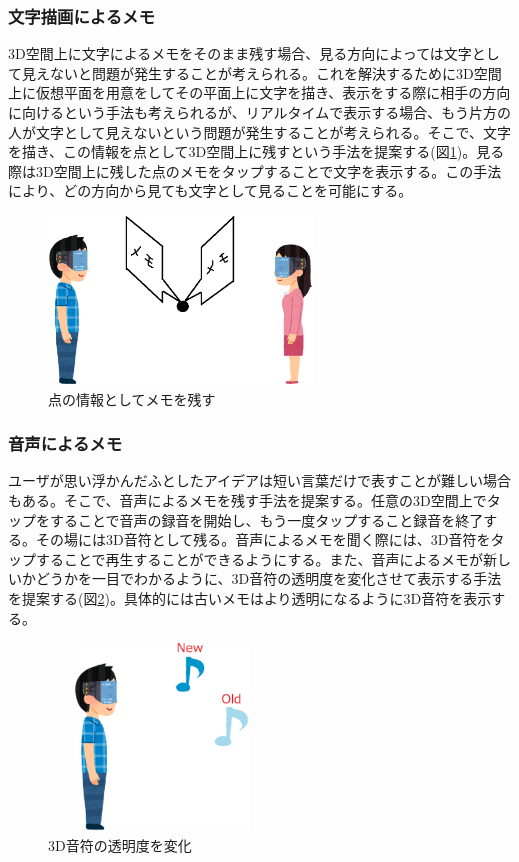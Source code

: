 \documentclass{hissymp}
\begin{document}
\subsubsection{文字描画によるメモ}
3D空間上に文字によるメモをそのまま残す場合、見る方向によっては文字として見えないと問題が発生することが考えられる。これを解決するために3D空間上に仮想平面を用意をしてその平面上に文字を描き、表示をする際に相手の方向に向けるという手法も考えられるが、リアルタイムで表示する場合、もう片方の人が文字として見えないという問題が発生することが考えられる。そこで、文字を描き、この情報を点として3D空間上に残すという手法を提案する(図\ref{fig:tennomemo})。見る際は3D空間上に残した点のメモをタップすることで文字を表示する。この手法により、どの方向から見ても文字として見ることを可能にする。

\begin{figure}[h]
  \begin{center}
    \includegraphics[clip,width=7.0cm]{./tennomemo.eps}
    \caption{点の情報としてメモを残す}
    \label{fig:tennomemo}
  \end{center}
\end{figure}

\subsubsection{音声によるメモ}
ユーザが思い浮かんだふとしたアイデアは短い言葉だけで表すことが難しい場合もある。そこで、音声によるメモを残す手法を提案する。任意の3D空間上でタップをすることで音声の録音を開始し、もう一度タップすること録音を終了する。その場には3D音符として残る。音声によるメモを聞く際には、3D音符をタップすることで再生することができるようにする。また、音声によるメモが新しいかどうかを一目でわかるように、3D音符の透明度を変化させて表示する手法を提案する(図\ref{fig:onpu_memo})。具体的には古いメモはより透明になるように3D音符を表示する。

\begin{figure}[h]
  \begin{center}
    \includegraphics[clip,height=5.0cm,width=6.0cm]{./onpu_memo.eps}
    \caption{3D音符の透明度を変化}
    \label{fig:onpu_memo}
  \end{center}
\end{figure}
\end{document}
